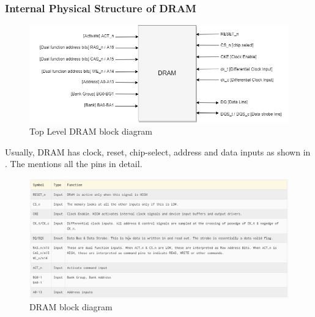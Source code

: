 \subsubsection{Internal Physical Structure of DRAM}

\begin{figure}[H]
	\begin{center}
		\includegraphics[width=\textwidth]{images/DRAMPHY.png}
		\caption{Top Level DRAM block diagram}
		\label{Top Level}
	\end{center}
\end{figure}

Usually, DRAM has clock, reset, chip-select, address and data inputs as shown in . The  mentions all the pins in detail.

\begin{figure}[H]
	\begin{center}
		\includegraphics[width=\textwidth]{images/DRAMPorts.png}
		\caption{DRAM block diagram}
		\label{DRAM ports}
	\end{center}
\end{figure}
